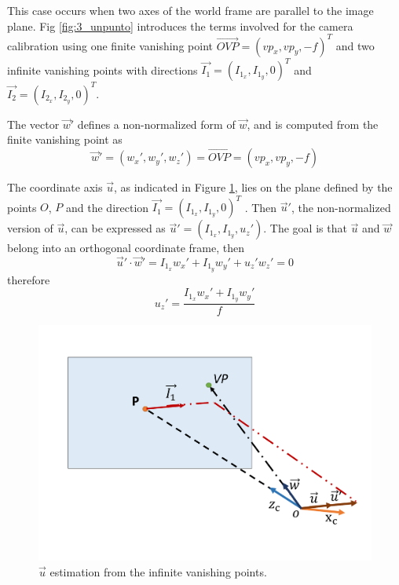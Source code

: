 This case occurs when two axes of the world frame are parallel to the image plane.  Fig \ref{fig:3_unpunto}
introduces the terms involved for the camera calibration
using one finite vanishing point $\overrightarrow{OVP} = (vp_{x}, vp_{y},-f )^T$ and
two infinite vanishing points with directions $\vec{I_1} = (I_{1_x}, I_{1_y},0)^T$
and $\vec{I_2} = (I_{2_x}, I_{2_y},0)^T$. \vskip 0.2cm


The vector $\vec{w}'$ defines a non-normalized form of  $\vec{w}$,
and is computed from the finite vanishing point as
\begin{equation}
	\label{oneVanish}
	\vec{w}'= (w_{x}',w_{y}',w_{z}')=\overrightarrow{OVP}=(vp_{x}, vp_{y},-f )
 \end{equation}

The coordinate axis $\vec{u}$, as indicated in Figure \ref{fig:3_unpuntoH}, lies
on the plane defined by the points $O$, $P$ and the direction
$\vec{I_1} = (I_{1_x}, I_{1_y},0)^T$ . Then $\vec{u}'$, the non-normalized version of
$\vec{u}$, can be expressed as $\vec{u}' = (I_{1_x}, I_{1_y},u_{z}')$. The goal is that
$\vec{u}$ and $\vec{w}$ belong into an orthogonal coordinate frame, then
\begin{equation}
	\vec{u}' \cdot  \vec{w}'= I_{1_x}w_{x}'+ I_{1_y}w_{y}'+u_{z}'w_{z}' =0
 \end{equation}
therefore
 \begin{equation}
	\label{PlanoU}
	u_{z}'=\frac{I_{1_x}w_{x}'+ I_{1_y}w_{y}'}{f}
\end{equation}

\begin{figure}[h]
\centering
\includegraphics[scale=0.5]{Chapter03/Images/twoInfiniteVPOneFVPH.pdf}
\caption{ $\vec{u}$ estimation from the infinite vanishing points.}
\label{fig:3_unpuntoH}
\end{figure}

